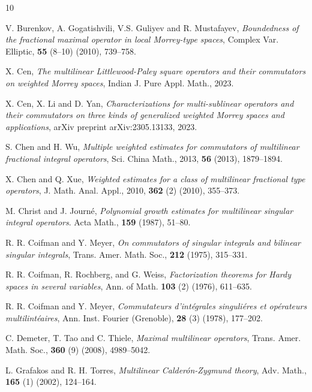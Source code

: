 \documentclass[11pt, twoside, leqno]{article}
\begin{document}
\begin{thebibliography}{10}
	
	V. Burenkov, A. Gogatishvili, V.S. Guliyev and R. Mustafayev, \emph{Boundedness of the fractional maximal operator in local Morrey-type spaces}, Complex Var. Elliptic,  \textbf{55} (8--10) (2010), 739--758.
	
	X. Cen, \emph{The multilinear Littlewood-Paley square operators and their commutators on weighted Morrey spaces}, Indian J. Pure Appl. Math., 2023.
	
	X. Cen, X. Li and D. Yan, \emph{Characterizations for multi-sublinear operators and their commutators on three kinds of generalized weighted Morrey spaces and applications},
	arXiv preprint arXiv:2305.13133, 2023.
	
	S. Chen and H. Wu, \emph{Multiple weighted estimates for commutators of multilinear fractional integral operators}, Sci. China Math., 2013, \textbf{56} (2013), 1879--1894.
	
	X. Chen and Q. Xue, \emph{Weighted estimates for a class of multilinear fractional type operators}, J. Math. Anal. Appl., 2010, \textbf{362} (2) (2010), 355--373.
	
	M. Christ  and J. Journ\'{e}, \emph{Polynomial growth estimates for multilinear singular integral operators}. Acta Math., \textbf{159} (1987), 51--80.
	
	R. R. Coifman and Y. Meyer, \emph{On commutators of singular integrals and bilinear singular integrals}, Trans. Amer. Math. Soc., \textbf{212} (1975), 315--331.
	
	R. R. Coifman, R. Rochberg, and G. Weiss, \emph{Factorization theorems for Hardy spaces in several variables}, Ann. of Math.  \textbf{103} (2) (1976), 611--635.
	
	R. R. Coifman and Y. Meyer, \emph{Commutateurs d'int\'{e}grales singuli\'{e}res et op\'{e}rateurs multilint\'{e}aires}, Ann. Inst. Fourier (Grenoble), \textbf{28} (3) (1978), 177--202.
	
	C. Demeter, T. Tao and C. Thiele, \emph{Maximal multilinear operators}, Trans. Amer. Math. Soc., \textbf{360} (9) (2008), 4989--5042.
	
	L. Grafakos and R. H. Torres, \emph{Multilinear Calder\'{o}n-Zygmund theory}, Adv. Math., \textbf{165} (1) (2002), 124--164.
	

\end{thebibliography}
\end{document}
